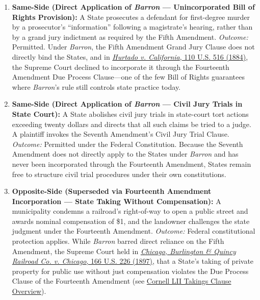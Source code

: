 \documentclass[12pt]{article}
\begin{document}
\begin{enumerate}
  \item \textbf{Same-Side (Direct Application of \textit{Barron} --- Unincorporated Bill of Rights Provision):} A State prosecutes a defendant for first-degree murder by a prosecutor's ``information'' following a magistrate's hearing, rather than by a grand jury indictment as required by the Fifth Amendment. \textit{Outcome:} Permitted. Under \textit{Barron}, the Fifth Amendment Grand Jury Clause does not directly bind the States, and in \href{https://supreme.justia.com/cases/federal/us/110/516/}{\textit{Hurtado v. California}, 110 U.S. 516 (1884)}, the Supreme Court declined to incorporate it through the Fourteenth Amendment Due Process Clause---one of the few Bill of Rights guarantees where \textit{Barron}'s rule still controls state practice today.

  \item \textbf{Same-Side (Direct Application of \textit{Barron} --- Civil Jury Trials in State Court):} A State abolishes civil jury trials in state-court tort actions exceeding twenty dollars and directs that all such claims be tried to a judge. A plaintiff invokes the Seventh Amendment's Civil Jury Trial Clause. \textit{Outcome:} Permitted under the Federal Constitution. Because the Seventh Amendment does not directly apply to the States under \textit{Barron} and has never been incorporated through the Fourteenth Amendment, States remain free to structure civil trial procedures under their own constitutions.

  \item \textbf{Opposite-Side (Superseded via Fourteenth Amendment Incorporation --- State Taking Without Compensation):} A municipality condemns a railroad's right-of-way to open a public street and awards nominal compensation of \$1, and the landowner challenges the state judgment under the Fourteenth Amendment. \textit{Outcome:} Federal constitutional protection applies. While \textit{Barron} barred direct reliance on the Fifth Amendment, the Supreme Court held in \href{https://supreme.justia.com/cases/federal/us/166/226/}{\textit{Chicago, Burlington \& Quincy Railroad Co. v. Chicago}, 166 U.S. 226 (1897)}, that a State's taking of private property for public use without just compensation violates the Due Process Clause of the Fourteenth Amendment (see \href{https://www.law.cornell.edu/constitution-conan/amendment-5/overview-of-the-takings-clause}{Cornell LII Takings Clause Overview}).


\end{enumerate}
\end{document}
